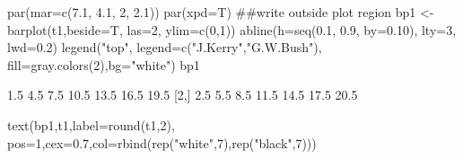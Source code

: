 \begin{Schunk}
\begin{Sinput}
 par(mar=c(7.1, 4.1, 2, 2.1))
 par(xpd=T) ##write outside plot region
 bp1 <- barplot(t1,beside=T, las=2, ylim=c(0,1))
 abline(h=seq(0.1, 0.9, by=0.10), lty=3,  lwd=0.2)
 legend("top", legend=c("J.Kerry","G.W.Bush"), fill=gray.colors(2),bg="white")
 bp1
\end{Sinput}
\begin{Soutput}
     [,1] [,2] [,3] [,4] [,5] [,6] [,7]
[1,]  1.5  4.5  7.5 10.5 13.5 16.5 19.5
[2,]  2.5  5.5  8.5 11.5 14.5 17.5 20.5
\end{Soutput}
\begin{Sinput}
 text(bp1,t1,label=round(t1,2), pos=1,cex=0.7,col=rbind(rep("white",7),rep("black",7)))
 
\end{Sinput}
\end{Schunk}
